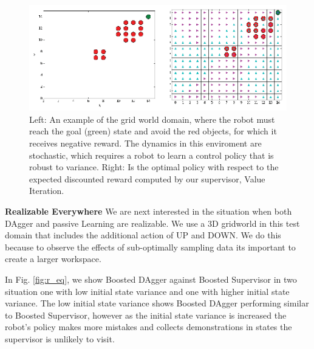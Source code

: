 \documentclass[10pt, conference]{ieeeconf}      %
\begin{document}
\begin{figure}
\centering
\includegraphics{f_figs/grid_world.eps}
\caption{
    \footnotesize
Left: An example of the grid world domain, where the robot must reach the goal (green) state and avoid the red objects, for which it receives negative reward. The dynamics in this enviroment are stochastic, which requires a robot to learn a control policy that is robust to variance. Right: Is the optimal policy with respect to the expected discounted reward computed by our supervisor, Value Iteration.  }
\vspace*{-10pt}
\label{fig:grid_world}
\end{figure}

\noindent \textbf{Realizable Everywhere} 
We are next interested in the situation when both DAgger and passive Learning are realizable. We use a 3D gridworld in this test domain that includes the additional action of UP and DOWN. We do this because to observe the effects of sub-optimally sampling data its important to create a larger workspace. 

In Fig. \ref{fig:r_eq}, we show Boosted DAgger against Boosted Supervisor in two situation one with low initial state variance and one with higher initial state variance. The low initial state variance shows Boosted DAgger performing similar to Boosted Supervisor, however as the initial state variance is increased the robot's policy makes more mistakes and collects demonstrations in states the supervisor is unlikely to visit. 
\end{document}
